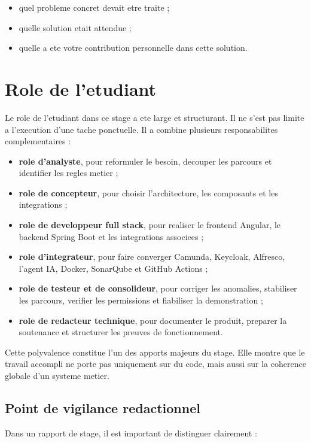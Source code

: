 \begin{itemize}[leftmargin=1.2cm]
  \item quel probleme concret devait etre traite ;
  \item quelle solution etait attendue ;
  \item quelle a ete votre contribution personnelle dans cette solution.
\end{itemize}

\section{Role de l'etudiant}

Le role de l'etudiant dans ce stage a ete large et structurant. Il ne s'est pas limite a l'execution d'une tache ponctuelle. Il a combine plusieurs responsabilites complementaires :

\begin{itemize}[leftmargin=1.2cm]
  \item \textbf{role d'analyste}, pour reformuler le besoin, decouper les parcours et identifier les regles metier ;
  \item \textbf{role de concepteur}, pour choisir l'architecture, les composants et les integrations ;
  \item \textbf{role de developpeur full stack}, pour realiser le frontend Angular, le backend Spring Boot et les integrations associees ;
  \item \textbf{role d'integrateur}, pour faire converger Camunda, Keycloak, Alfresco, l'agent IA, Docker, SonarQube et GitHub Actions ;
  \item \textbf{role de testeur et de consolideur}, pour corriger les anomalies, stabiliser les parcours, verifier les permissions et fiabiliser la demonstration ;
  \item \textbf{role de redacteur technique}, pour documenter le produit, preparer la soutenance et structurer les preuves de fonctionnement.
\end{itemize}

Cette polyvalence constitue l'un des apports majeurs du stage. Elle montre que le travail accompli ne porte pas uniquement sur du code, mais aussi sur la coherence globale d'un systeme metier.

\subsection{Point de vigilance redactionnel}

Dans un rapport de stage, il est important de distinguer clairement :

